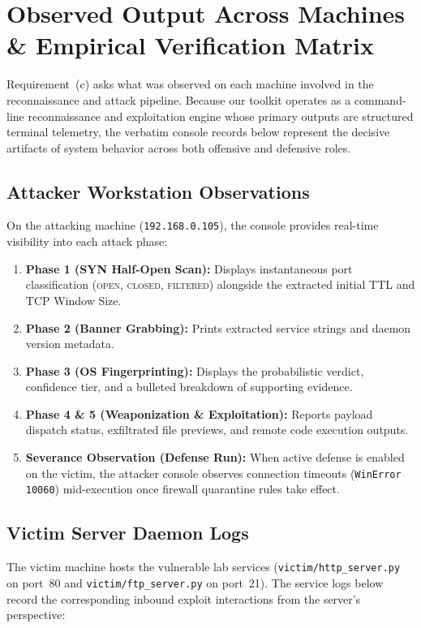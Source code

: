 \section{Observed Output Across Machines \& Empirical Verification Matrix}

Requirement~(c) asks what was observed on each machine involved in the reconnaissance and attack
pipeline. Because our toolkit operates as a command-line reconnaissance and exploitation engine
whose primary outputs are structured terminal telemetry, the verbatim console records below
represent the decisive artifacts of system behavior across both offensive and defensive roles.

\subsection{Attacker Workstation Observations}
On the attacking machine (\texttt{192.168.0.105}), the console provides real-time visibility into
each attack phase:
\begin{enumerate}
    \item \textbf{Phase 1 (SYN Half-Open Scan):} Displays instantaneous port classification
    (\textsc{open}, \textsc{closed}, \textsc{filtered}) alongside the extracted initial TTL and
    TCP Window Size.
    \item \textbf{Phase 2 (Banner Grabbing):} Prints extracted service strings and daemon version
    metadata.
    \item \textbf{Phase 3 (OS Fingerprinting):} Displays the probabilistic verdict, confidence tier,
    and a bulleted breakdown of supporting evidence.
    \item \textbf{Phase 4 \& 5 (Weaponization \& Exploitation):} Reports payload dispatch status,
    exfiltrated file previews, and remote code execution outputs.
    \item \textbf{Severance Observation (Defense Run):} When active defense is enabled on the victim,
    the attacker console observes connection timeouts (\texttt{WinError 10060}) mid-execution once
    firewall quarantine rules take effect.
\end{enumerate}

\subsection{Victim Server Daemon Logs}
The victim machine hosts the vulnerable lab services (\texttt{victim/http\_server.py} on port~80 and
\texttt{victim/ftp\_server.py} on port~21). The service logs below record the corresponding inbound
exploit interactions from the server's perspective:

